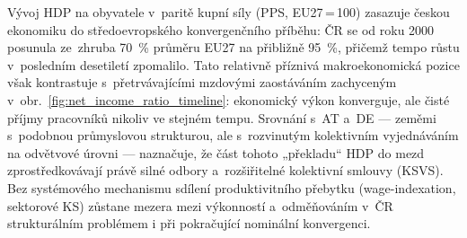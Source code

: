 Vývoj \ac{HDP} na obyvatele v~paritě kupní síly (\ac{PPS}, EU27\,=\,100) zasazuje českou ekonomiku do středoevropského konvergenčního příběhu: ČR se od roku 2000 posunula ze~zhruba \SI{70}{\percent} průměru EU27 na přibližně \SI{95}{\percent}, přičemž tempo růstu v~posledním desetiletí zpomalilo.
Tato relativně příznivá makroekonomická pozice však kontrastuje s~přetrvávajícími mzdovými zaostáváním zachyceným v~obr.~\ref{fig:net_income_ratio_timeline}: ekonomický výkon konverguje, ale čisté příjmy pracovníků nikoliv ve stejném tempu.
Srovnání s~AT a~DE --- zeměmi s~podobnou průmyslovou strukturou, ale s~rozvinutým kolektivním vyjednáváním na odvětvové úrovni --- naznačuje, že část tohoto „překladu“ \ac{HDP} do mezd zprostředkovávají právě silné odbory a~rozšiřitelné kolektivní smlouvy (\ac{KSVS}).
Bez systémového mechanismu sdílení produktivitního přebytku (wage-indexation, sektorové \ac{KS}) zůstane mezera mezi výkonností a~odměňováním v~ČR strukturálním problémem i při pokračující nominální konvergenci.


